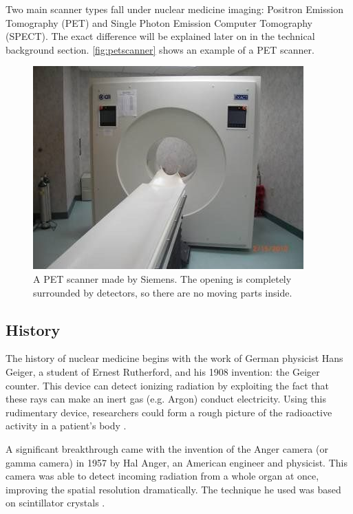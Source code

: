 Two main scanner types fall under nuclear medicine imaging: Positron Emission
Tomography (PET) and Single Photon Emission Computer Tomography (SPECT). The
exact difference will be explained later on in the technical background section.
\autoref{fig:petscanner} shows an example of a PET scanner.

\begin{figure}[ht]
\begin{center}
  \includegraphics[width=\linewidth]{img/petscanner.jpg}
  \caption{A PET scanner made by Siemens. The opening is completely surrounded
  by detectors, so there are no moving parts inside.}
  \label{fig:petscanner}
\end{center}
\end{figure}

\subsection{History}
The history of nuclear medicine begins with the work of German physicist Hans
Geiger, a student of Ernest Rutherford, and his 1908 invention: the Geiger
counter. This device can detect ionizing radiation by exploiting the fact that
these rays can make an inert gas (e.g. Argon) conduct electricity. Using
this rudimentary device, researchers could form a rough picture of the radioactive
activity in a patient's body \cite{specthistory, geigercountertube}.

A significant breakthrough came with the invention of the Anger camera (or
gamma camera) in 1957 by Hal Anger, an American engineer and physicist. This
camera was able to detect incoming radiation from a whole organ at once,
improving the spatial resolution dramatically. The technique he used was based
on scintillator crystals \cite{anger}.

